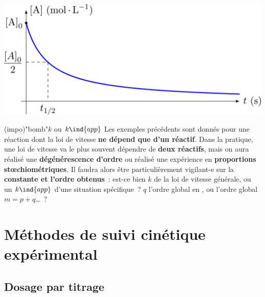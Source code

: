 \documentclass[../../main/main.tex]{subfiles}
\begin{document}
\begin{tcb}[label=ror:resumeordre, tabularx={l|Y|Y|Y}]
\begin{center}
{		}{
			\includegraphics[width=\linewidth]{ordre2}
		}%
	\end{center}
\end{tcb}

\begin{tcb*}[breakable](impo)"bomb"{$k$ ou $k\ind{app}$}
	Les exemples précédents sont donnés pour une réaction dont la loi de vitesse
	\textbf{ne dépend que d'un réactif}. Dans la pratique, une loi de vitesse va
	le plus souvent dépendre de \textbf{deux réactifs}, mais on aura réalisé une
	\textbf{dégénérescence d'ordre} ou réalisé une expérience en
	\textbf{proportions stœchiométriques}.
	\smallbreak
	Il faudra alors être particulièrement vigilant-e sur la \textbf{constante et
		l'ordre obtenus}~: est-ce bien $k$ de la loi de vitesse générale, ou un
	$k\ind{app}$ d'une situation spécifique~? $q$ l'ordre global en , ou
	l'ordre global $m = p+q$…~?
\end{tcb*}


\section{Méthodes de suivi cinétique expérimental}
\subsection{Dosage par titrage}
\end{document}
